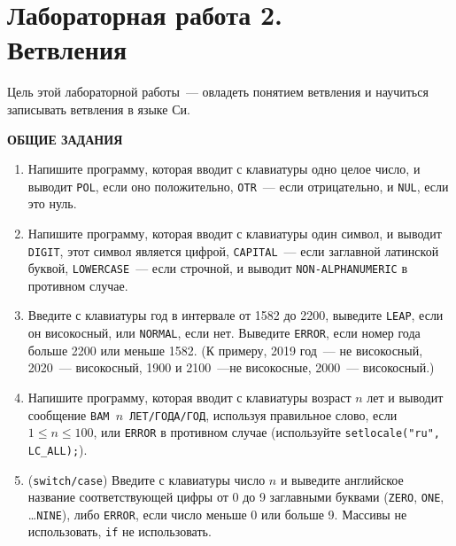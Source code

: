\documentclass{article}
\begin{document}
\section*{{\normalsize Лабораторная работа 2.} \\Ветвления}

Цель этой лабораторной работы~--- овладеть понятием ветвления и научиться записывать ветвления в языке Си. 

\bigskip
\hfill\textbf{ОБЩИЕ ЗАДАНИЯ}\hfill{~}
\bigskip
\sloppy

\begin{enumerate}
\item
Напишите программу, которая вводит с клавиатуры одно целое число, и выводит \texttt{POL}, если оно положительно, \texttt{OTR}~--- если отрицательно, и \texttt{NUL}, если это нуль.
\item 
Напишите программу, которая вводит с клавиатуры один символ, и выводит \texttt{DIGIT}, этот символ является цифрой, \texttt{CAPITAL}~--- если заглавной латинской буквой, \texttt{LOWERCASE}~--- если строчной, и выводит \texttt{NON-ALPHANUMERIC} в противном случае.
\item
Введите с клавиатуры год в интервале от 1582 до 2200, выведите \texttt{LEAP}, если он високосный, или \texttt{NORMAL}, если нет. Выведите \texttt{ERROR}, если номер года больше 2200 или меньше 1582. (К примеру, 2019 год~--- не високосный, 2020~--- високосный, 1900 и 2100~---не високосные, 2000~--- високосный.)
\item
Напишите программу, которая вводит с клавиатуры возраст $n$ лет и выводит сообщение \texttt{ВАМ $n$ ЛЕТ/ГОДА/ГОД}, используя правильное слово, если $1 \leqslant n \leqslant 100$, или  \texttt{ERROR} в противном случае 
(используйте \texttt{setlocale("ru"{}, LC\_ALL);}).
\item
(\texttt{switch/case}) Введите с клавиатуры число $n$ и выведите английское название соответствующей цифры от 0 до 9 заглавными буквами (\texttt{ZERO}, \texttt{ONE}, \ldots \texttt{NINE}), либо \texttt{ERROR}, если число меньше 0 или больше 9. Массивы не использовать, \texttt{if} не использовать.
\end{enumerate}
\end{document}
